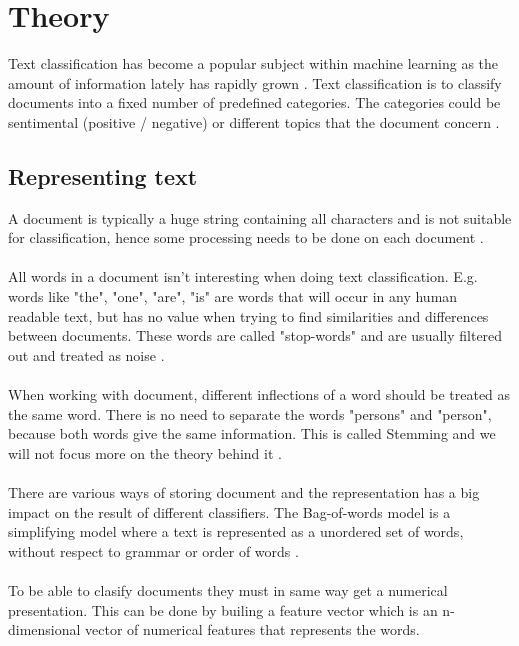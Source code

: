 \section{Theory}
Text classification has become a popular subject within machine learning as the amount of information lately has rapidly grown \citep{joachims}. Text classification is to
classify documents into a fixed number of predefined categories. The categories
could be sentimental (positive / negative) or different topics that the
document concern \cite{ngrams_ai}.

\subsection{Representing text}
A document is typically a huge string containing all characters and is not
suitable for classification, hence some processing needs to be done on each
document \cite{ngrams_ai}.
\\\\
All words in a document isn't interesting when doing text classification. E.g.
words like "the", "one", "are", "is" are words that will occur in any human
readable text, but has no value when trying to find similarities and
differences between documents. These words are called "stop-words" and are
usually filtered out and treated as noise \cite{joachims}.
\\\\
When working with document, different inflections of a word should be treated
as the same word. There is no need to separate the words "persons" and
"person", because both words give the same information. This is called Stemming
and we will not focus more on the theory behind it \cite{stemming}.
\\\\
There are various ways of storing document and the representation has a big
impact on the result of different classifiers. The Bag-of-words model is a
simplifying model where a text is represented as a unordered set of words,
without respect to grammar or order of words \citep{bag_of_words}.
\\\\
To be able to clasify documents they must
in same way get a numerical presentation. This can be done by builing a
feature vector which is an n-dimensional vector of numerical features
that represents the words.

